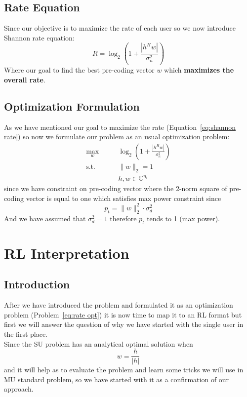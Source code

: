 \subsection{Rate Equation}
Since our objective is to maximize the rate of each user so we now introduce Shannon rate equation:
\begin{equation}
    \label{eq:shannon rate}
    R = \log_2 \left( 1 + \frac{| h^H w |}{ \sigma^2_n } \right)
\end{equation}
Where our goal to find the best pre-coding vector $w$ which \textbf{maximizes the overall rate}.

\subsection{Optimization Formulation}
As we have mentioned our goal to maximize the rate (Equation~\ref{eq:shannon rate}) so now we formulate our problem as an usual optimization problem:
\begin{equation}
    \label{eq:rate opt}
    \begin{aligned}
        \max_w \qquad & \log_2 \left( 1 + \frac{| h^H w |}{ \sigma^2_n } \right) \\
        \text{s.t.} \qquad & \|w\|_2 = 1 \\
        & h, w \in \mathbb{C}^{n_t}
    \end{aligned}
\end{equation}
since we have constraint on pre-coding vector where the 2-norm square of pre-coding vector is equal to one which satisfies max power constraint since
\[ p_t = \|w\|^2_2 \cdot \sigma^2_d \]
And we have assumed that $\sigma^2_d = 1$ therefore $p_t$ tends to 1 (max power).

\section{RL Interpretation}
\subsection{Introduction}
After we have introduced the problem and formulated it as an optimization problem (Problem~\ref{eq:rate opt}) it is now time
to map it to an RL format but first we will answer the question of why we have started with the single user in the first place.\\
Since the SU problem has an analytical optimal solution when \[ w=\frac{h}{|h|} \] and it will help as to evaluate the problem and learn some tricks we will use in MU standard problem, so we have started with it as a confirmation of our approach.

